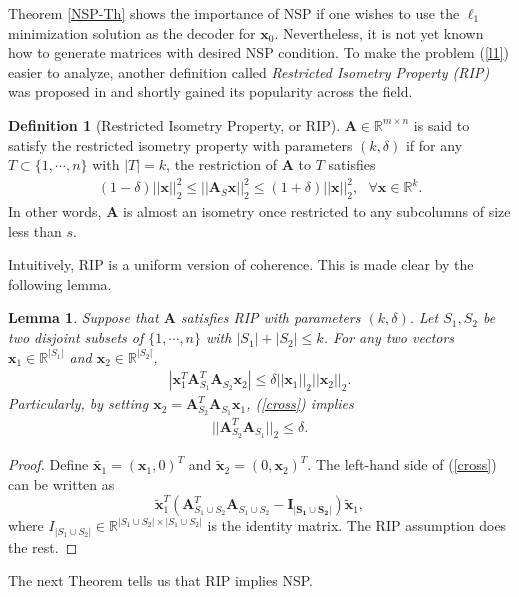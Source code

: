 \documentclass[11pt]{article}
\numberwithin{equation}{section}
\theoremstyle{plain}
\newtheorem{Lemma}[Th]{Lemma}
\theoremstyle{definition}
\newtheorem{Def}[Th]{Definition}
\def\R{{\mathbb R}}
\def\R{{\mathbb R}}
\def\A{{\mathbf A}}
\def\x{{\mathbf x}}
\begin{document}
Theorem \ref{NSP-Th} shows the importance of NSP if one wishes to use the $\ell_1$ minimization solution as the decoder for $\x_0$. Nevertheless, it is not yet known how to generate matrices with desired NSP condition. To make the problem (\ref{l1}) easier to analyze, another definition called \emph{Restricted Isometry Property (RIP)} was proposed in \cite{candes2004near} and shortly gained its popularity across the field.  

\begin{Def}[Restricted Isometry Property, or RIP]
$\A\in\R^{m\times n}$ is said to satisfy the restricted isometry property with parameters $(k, \delta)$ if for any $T\subset\{1, \cdots, n\}$ with $|T|= k$, the restriction of $\A$ to $T$ satisfies
\begin{align}
(1-\delta)||\x||^2_2\leq ||\A_S\x||^2_2\leq (1+\delta)||\x||^2_2, \ \ \ \forall\x\in\R^k. 
\end{align}
In other words, $\A$ is almost an isometry once restricted to any subcolumns of size less than $s$.  
\end{Def}

Intuitively, RIP is a uniform version of coherence. This is made clear by the following lemma. 

\begin{Lemma}
Suppose that $\A$ satisfies RIP with parameters $(k, \delta)$. Let $S_1, S_2$ be two disjoint subsets of $\{1, \cdots, n\}$ with $|S_1|+|S_2|\leq k$. For any two vectors $\x_1\in\R^{|S_1|}$ and $\x_2\in\R^{|S_2|}$,
\begin{align}
|\x^T_1\A^T_{S_1}\A_{S_2}\x_2|\leq \delta||\x_1||_2||\x_2||_2.\label{cross}
\end{align}
Particularly, by setting $\x_2 = \A^T_{S_2}\A_{S_1}\x_1$, (\ref{cross}) implies  
\begin{align}
||\A^T_{S_2}\A_{S_1}||_2\leq \delta.
\end{align}
\end{Lemma} 

\begin{proof}
Define $\tilde{\x_1} = (\x_1, 0)^T$ and $\tilde{\x}_2 = (0, \x_2)^T$. The left-hand side of (\ref{cross}) can be written as $$\tilde{\x}^T_1(\A^T_{S_1\cup S_2}\A_{S_1\cup S_2}-\mathbf{I_{|S_1\cup S_2|}})\tilde{\x}_1,$$ 
where $I_{|S_1\cup S_2|}\in\R^{|S_1\cup S_2|\times |S_1\cup S_2|}$ is the identity matrix. The RIP assumption does the rest.  
\end{proof}   


The next Theorem tells us that RIP implies NSP. 
\end{document}
